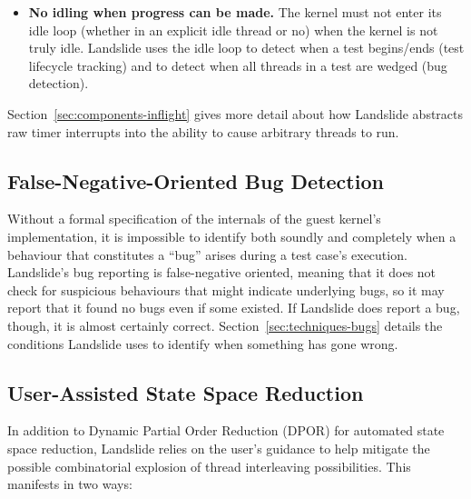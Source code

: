 {\begin{itemize}
	Landslide treats the sleep queue no differently from the runqueue when deciding which threads are runnable. The guest kernel will treat it differently, but since sleeping for a predetermined amount of time is never an appropriate way to solve race conditions, Landslide treats sleeping threads as notionally runnable. This fits directly into its model that runnable threads are ones that can be caused to run with a finite number of timer ticks in succession.
	\item {\bf No idling when progress can be made.} The kernel must not enter its idle loop (whether in an explicit idle thread or no) when the kernel is not truly idle. Landslide uses the idle loop to detect when a test begins/ends (test lifecycle tracking) and to detect when all threads in a test are wedged (bug detection).
\end{itemize}

Section~\ref{sec:components-inflight} gives more detail about how Landslide abstracts raw timer interrupts into the ability to cause arbitrary threads to run.

\subsection{False-Negative-Oriented Bug Detection}
\label{sec:model-bugs}

Without a formal specification of the internals of the guest kernel's implementation\cite{sel4}, it is impossible to identify both soundly and completely when a behaviour that constitutes a ``bug'' arises during a test case's execution.
Landslide's bug reporting is false-negative oriented, meaning that it does not check for suspicious behaviours that might indicate underlying bugs, so it may report that it found no bugs even if some existed. If Landslide does report a bug, though, it is almost certainly correct. Section~\ref{sec:techniques-bugs} details the conditions Landslide uses to identify when something has gone wrong.

\subsection{User-Assisted State Space Reduction}
\label{sec:model-user}

In addition to Dynamic Partial Order Reduction (DPOR) for automated state space reduction, Landslide relies on the user's guidance to help mitigate the possible combinatorial explosion of thread interleaving possibilities. This manifests in two ways:

}

